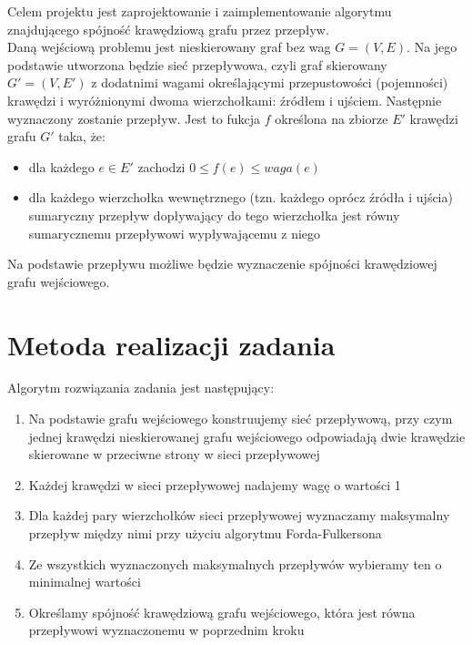 \documentclass{article}
\begin{document}
Celem projektu jest zaprojektowanie i zaimplementowanie algorytmu znajdującego spójność krawędziową grafu przez przepływ.\\

Daną wejściową problemu jest nieskierowany graf bez wag $G=(V,E)$. Na jego podstawie utworzona będzie sieć przepływowa, czyli graf skierowany $G'=(V,E')$ z dodatnimi wagami określającymi przepustowości (pojemności) krawędzi i wyróżnionymi dwoma wierzchołkami: źródłem i ujściem. Następnie wyznaczony zostanie przepływ. Jest to fukcja $f$ określona na zbiorze $E'$ krawędzi grafu $G'$ taka, że:
\begin{itemize}
    \item dla każdego $e\in E'$ zachodzi $0\le f(e)\le waga(e)$
    \item dla każdego wierzchołka wewnętrznego (tzn. każdego oprócz źródła i ujścia) sumaryczny przepływ dopływający do tego wierzchołka jest równy sumarycznemu przepływowi wypływającemu z niego
\end{itemize}
Na podstawie przepływu możliwe będzie wyznaczenie spójności krawędziowej grafu wejściowego.


\section{Metoda realizacji zadania}

Algorytm rozwiązania zadania jest następujący:
\begin{enumerate}
\item Na podstawie grafu wejściowego konstruujemy sieć przepływową, przy czym jednej krawędzi nieskierowanej grafu wejściowego odpowiadają dwie krawędzie skierowane w przeciwne strony w sieci przepływowej
\item Każdej krawędzi w sieci przepływowej nadajemy wagę o wartości 1
\item Dla każdej pary wierzchołków sieci przepływowej wyznaczamy maksymalny przepływ między nimi przy użyciu algorytmu Forda-Fulkersona
\item Ze wszystkich wyznaczonych maksymalnych przepływów wybieramy ten o minimalnej wartości
\item Określamy spójność krawędziową grafu wejściowego, która jest równa przepływowi wyznaczonemu w poprzednim kroku
\end{enumerate}

\end{document}
